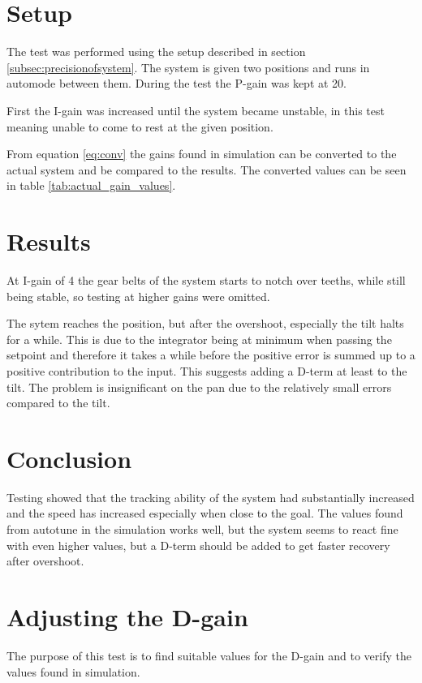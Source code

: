 \section*{Setup} The test was performed using the setup described in
section \ref{subsec:precisionofsystem}. The system is given two positions and runs in
automode between them. During the test the P-gain was kept at 20.

First the I-gain was increased until the system became
unstable, in this test meaning unable to come to rest at the given position.

From equation \ref{eq:conv} the gains found in simulation can be converted to the actual
system and be compared to the results. The converted values can be seen in
table \ref{tab:actual_gain_values}. 

\section*{Results} 
At I-gain of 4 the gear belts of the system starts
to notch over teeths, while still being stable, so testing at higher gains were
omitted.

The sytem reaches the position, but after the overshoot,
especially the tilt halts for a while. This is due to the integrator being at
minimum when passing the setpoint and therefore it takes a while before the
positive error is summed up to a positive contribution to the input. This
suggests adding a D-term at least to the tilt. The problem is insignificant on
the pan due to the relatively small errors compared to the tilt.

\section*{Conclusion} Testing showed that the tracking ability of the system
had substantially increased and the speed has increased especially when close to
the goal. The values found from autotune in the simulation works well, but the
system seems to react fine with even higher values, but a  D-term should be
added to get faster recovery after overshoot.

\section{Adjusting the D-gain}\label{sec:pid_experiments_d}
The purpose of this test is to find suitable values for the D-gain and to verify
the values found in simulation.

